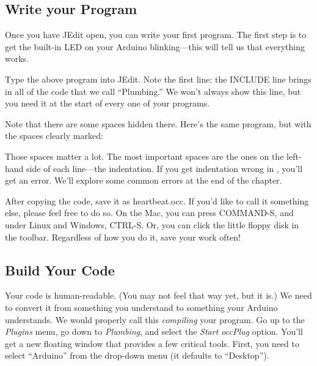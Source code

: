 \afterpage{\clearpage}

\subsection{Write your Program}
Once you have JEdit open, you can write your first program. The first step is to get the built-in LED on your Arduino blinking---this will tell us that everything works. 



Type the above program into JEdit. Note the first line: the {\code INCLUDE} line brings in all of the code that we call ``Plumbing.'' We won't always show this line, but {\strong you need it at the start of every one of your programs}.

Note that there are some spaces hidden there. Here's the same program, but with the spaces clearly marked:



Those {\strong spaces matter a lot}. The most important spaces are the ones on the left-hand side of each line---the {\strong indentation}. If you get indentation wrong in \occam, you'll get an error. We'll explore some common errors at the end of the chapter. 

After copying the code, save it as {\code heartbeat.occ}. If you'd like to call it something else, please feel free to do so. On the Mac, you can press COMMAND-S, and under Linux and Windows, CTRL-S. Or, you can click the little floppy disk in the toolbar. Regardless of how you do it, save your work often!


\subsection{Build Your Code}
Your code is human-readable. (You may not feel that way yet, but it is.) We need to convert it from something you understand to something your Arduino understands. We would properly call this {\em compiling} your program. Go up to the {\em Plugins} menu, go down to {\em Plumbing}, and select the {\em Start occPlug} option. You'll get a new floating window that provides a few critical tools. First, you need to select ``Arduino'' from the drop-down menu (it defaults to ``Desktop'').

